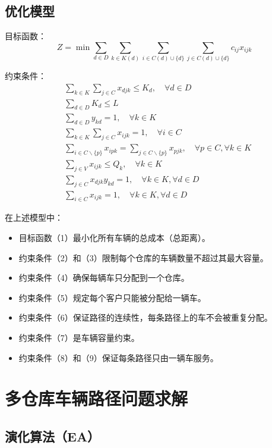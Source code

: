 \documentclass[12pt,a4paper,oneside]{ctexart}
\begin{document}
\subsection{优化模型}
目标函数：
\begin{equation}
	Z = \min \sum_{d \in D} \sum_{k \in K(d)} \sum_{i \in C(d) \cup \{d\}} \sum_{j \in C(d) \cup \{d\}} c_{ij} x_{ijk}
\end{equation}

约束条件：
\begin{align}
	&\sum_{k \in K} \sum_{j \in C} x_{djk} \leq K_d, \quad \forall d \in D \\
	&\sum_{d \in D} K_d \leq L \\
	&\sum_{d \in D} y_{kd} = 1, \quad \forall k \in K \\
	&\sum_{k \in K} \sum_{j \in C} x_{ijk} = 1, \quad \forall i \in C \\
	&\sum_{i \in C \backslash \{p\}} x_{ipk} = \sum_{j \in C \backslash \{p\}} x_{pjk}, \quad \forall p \in C, \forall k \in K \\
	&\sum_{j \in V} x_{ijk} \leq Q_k, \quad \forall k \in K \\
	&\sum_{j \in C} x_{djk} y_{kd} = 1, \quad \forall k \in K, \forall d \in D \\
	&\sum_{i \in C} x_{ijk} = 1, \quad \forall k \in K, \forall d \in D
\end{align}

在上述模型中：
\begin{itemize}
	\item 目标函数（1）最小化所有车辆的总成本（总距离）。
	\item 约束条件（2）和（3）限制每个仓库的车辆数量不超过其最大容量。
	\item 约束条件（4）确保每辆车只分配到一个仓库。
	\item 约束条件（5）规定每个客户只能被分配给一辆车。
	\item 约束条件（6）保证路径的连续性，每条路径上的车不会被重复分配。
	\item 约束条件（7）是车辆容量约束。
	\item 约束条件（8）和（9）保证每条路径只由一辆车服务。
\end{itemize}
	
\section{多仓库车辆路径问题求解}
\subsection{演化算法（EA）}
\end{document}
